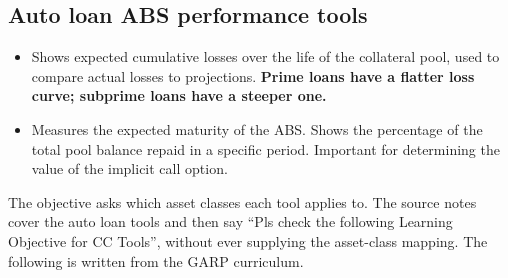 
\subsection*{Auto loan ABS performance tools}

\begin{itemize}
\item {} Shows expected cumulative losses over the life of the
collateral pool, used to compare actual losses to projections. \textbf{Prime loans
have a flatter loss curve; subprime loans have a steeper one.}
\item {} Measures the expected maturity of
the ABS. Shows the percentage of the total pool balance repaid in a specific
period. Important for determining the value of the implicit call option.
\end{itemize}

\gapbadge

{\footnotesize\color{FRMGrey}The objective asks which asset classes each tool
applies to. The source notes cover the auto loan tools and then say ``Pls check
the following Learning Objective for CC Tools'', without ever supplying the
asset-class mapping. The following is written from the GARP curriculum.}

